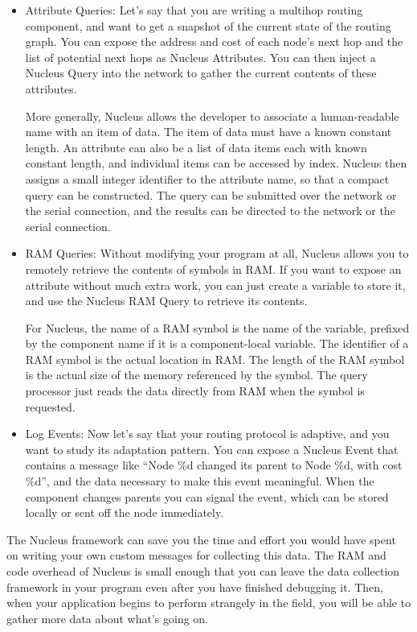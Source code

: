 \documentclass{article}
\begin{document}
\begin{itemize}

\item Attribute Queries: Let's say that you are writing a multihop
routing component, and want to get a snapshot of the current state of
the routing graph. You can expose the address and cost of each node's
next hop and the list of potential next hops as Nucleus Attributes.
You can then inject a Nucleus Query into the network to gather the
current contents of these attributes. 

More generally, Nucleus allows the developer to associate a
human-readable name with an item of data. The item of data must have a
known constant length. An attribute can also be a list of data items
each with known constant length, and individual items can be accessed
by index. Nucleus then assigns a small integer identifier to the
attribute name, so that a compact query can be constructed. The query
can be submitted over the network or the serial connection, and the
results can be directed to the network or the serial connection.

\item RAM Queries: Without modifying your program at all, Nucleus
allows you to remotely retrieve the contents of symbols in RAM. If you
want to expose an attribute without much extra work, you can just
create a variable to store it, and use the Nucleus RAM Query to
retrieve its contents.

For Nucleus, the name of a RAM symbol is the name of the variable,
prefixed by the component name if it is a component-local
variable. The identifier of a RAM symbol is the actual location in
RAM. The length of the RAM symbol is the actual size of the memory
referenced by the symbol. The query processor just reads the data
directly from RAM when the symbol is requested.

\item Log Events: Now let's say that your routing protocol is
adaptive, and you want to study its adaptation pattern. You can expose
a Nucleus Event that contains a message like ``Node \%d changed its
parent to Node \%d, with cost \%d'', and the data necessary to make
this event meaningful. When the component changes parents you can
signal the event, which can be stored locally or sent off the node
immediately.

\end{itemize}

The Nucleus framework can save you the time and effort you would have
spent on writing your own custom messages for collecting this
data. The RAM and code overhead of Nucleus is small enough that you
can leave the data collection framework in your program even after you
have finished debugging it. Then, when your application begins to
perform strangely in the field, you will be able to gather more data
about what's going on.
\end{document}
